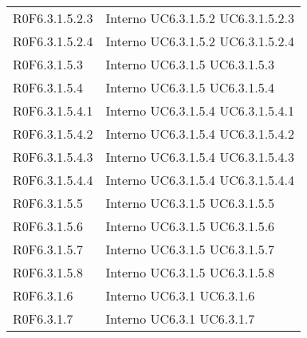 \begin{longtable}{p{2.5cm}!{\VRule[1pt]}p{2.5cm}}
R0F6.3.1.5.2.3 & Interno \newline UC6.3.1.5.2
 \newline UC6.3.1.5.2.3
 \\
R0F6.3.1.5.2.4 & Interno \newline UC6.3.1.5.2
 \newline UC6.3.1.5.2.4
 \\
R0F6.3.1.5.3 & Interno \newline UC6.3.1.5
 \newline UC6.3.1.5.3
 \\
R0F6.3.1.5.4 & Interno \newline UC6.3.1.5
 \newline UC6.3.1.5.4
 \\
R0F6.3.1.5.4.1 & Interno \newline UC6.3.1.5.4
 \newline UC6.3.1.5.4.1
 \\
R0F6.3.1.5.4.2 & Interno \newline UC6.3.1.5.4
 \newline UC6.3.1.5.4.2
 \\
R0F6.3.1.5.4.3 & Interno \newline UC6.3.1.5.4
 \newline UC6.3.1.5.4.3
 \\
R0F6.3.1.5.4.4 & Interno \newline UC6.3.1.5.4
 \newline UC6.3.1.5.4.4
 \\
R0F6.3.1.5.5 & Interno \newline UC6.3.1.5
 \newline UC6.3.1.5.5
 \\
R0F6.3.1.5.6 & Interno \newline UC6.3.1.5
 \newline UC6.3.1.5.6
 \\
R0F6.3.1.5.7 & Interno \newline UC6.3.1.5
 \newline UC6.3.1.5.7
 \\
R0F6.3.1.5.8 & Interno \newline UC6.3.1.5
 \newline UC6.3.1.5.8
 \\
R0F6.3.1.6 & Interno \newline UC6.3.1
 \newline UC6.3.1.6
 \\
R0F6.3.1.7 & Interno \newline UC6.3.1
 \newline UC6.3.1.7

\end{longtable}

